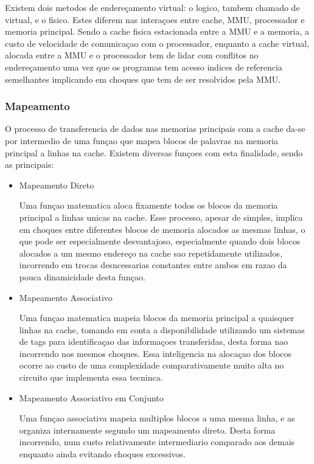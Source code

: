 \documentclass[12pt]{article}
\begin{document}
Existem dois metodos de endereçamento virtual: o logico, tambem chamado de virtual, e o fisico. Estes diferem nas interaçoes entre cache, MMU, processador e memoria principal. Sendo a cache fisica estacionada entre a MMU e a memoria, a custo de velocidade de comunicaçao com o processador, enquanto a cache virtual, alocada entre a MMU e o processador tem de lidar com conflitos no endereçamento uma vez que os programas tem acesso indices de referencia semelhantes implicando em choques que tem de ser resolvidos pela MMU.
\subsubsection*{Mapeamento}
O processo de transferencia de dados nas memorias principais com a cache da-se por intermedio de uma funçao que mapea blocos de palavras na memoria principal a linhas na cache. Existem diversas funçoes com esta finalidade, sendo as principais:

\begin{itemize}
\item Mapeamento Direto

Uma funçao matematica aloca fixamente todos os blocos da memoria principal a linhas unicas na cache. Esse processo, apesar de simples, implica em choques entre diferentes blocos de memoria alocados as mesmas linhas, o que pode ser especialmente desvantajoso, especialmente quando dois blocos alocados a um mesmo endereço na cache sao repetidamente utilizados, incorrendo em trocas desncessarias constantes entre ambos em razao da pouca dinamicidade desta funçao.

\item Mapeamento Associativo

Uma funçao matematica mapeia blocos da memoria principal a quaisquer linhas na cache, tomando em conta a disponibilidade utilizando um sistemas de tags para identificaçao das informaçoes transferidas, desta forma nao incorrendo nos mesmos choques. Essa inteligencia na alocaçao dos blocos ocorre ao custo de uma complexidade comparativamente muito alta no circuito que implementa essa tecninca.

\item Mapeamento Associativo em Conjunto

Uma funçao associativa mapeia multiplos blocos a uma mesma linha, e as organiza internamente segundo um mapeamento direto. Desta forma incorrendo, num custo relativamente intermediario comparado aos demais enquanto ainda evitando choques excessivos.
\end{itemize}
\end{document}
